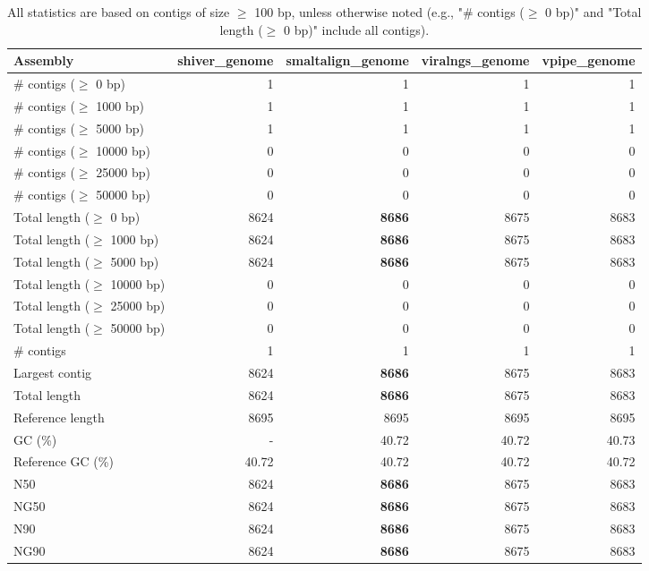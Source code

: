 \documentclass[12pt,a4paper]{article}
\begin{document}
\begin{table}[ht]
\begin{center}
\caption{All statistics are based on contigs of size $\geq$ 100 bp, unless otherwise noted (e.g., "\# contigs ($\geq$ 0 bp)" and "Total length ($\geq$ 0 bp)" include all contigs).}
\begin{tabular}{|l*{4}{|r}|}
\hline
Assembly & shiver\_genome & smaltalign\_genome & viralngs\_genome & vpipe\_genome \\ \hline
\# contigs ($\geq$ 0 bp) & 1 & 1 & 1 & 1 \\ \hline
\# contigs ($\geq$ 1000 bp) & 1 & 1 & 1 & 1 \\ \hline
\# contigs ($\geq$ 5000 bp) & 1 & 1 & 1 & 1 \\ \hline
\# contigs ($\geq$ 10000 bp) & 0 & 0 & 0 & 0 \\ \hline
\# contigs ($\geq$ 25000 bp) & 0 & 0 & 0 & 0 \\ \hline
\# contigs ($\geq$ 50000 bp) & 0 & 0 & 0 & 0 \\ \hline
Total length ($\geq$ 0 bp) & 8624 & {\bf 8686} & 8675 & 8683 \\ \hline
Total length ($\geq$ 1000 bp) & 8624 & {\bf 8686} & 8675 & 8683 \\ \hline
Total length ($\geq$ 5000 bp) & 8624 & {\bf 8686} & 8675 & 8683 \\ \hline
Total length ($\geq$ 10000 bp) & 0 & 0 & 0 & 0 \\ \hline
Total length ($\geq$ 25000 bp) & 0 & 0 & 0 & 0 \\ \hline
Total length ($\geq$ 50000 bp) & 0 & 0 & 0 & 0 \\ \hline
\# contigs & 1 & 1 & 1 & 1 \\ \hline
Largest contig & 8624 & {\bf 8686} & 8675 & 8683 \\ \hline
Total length & 8624 & {\bf 8686} & 8675 & 8683 \\ \hline
Reference length & 8695 & 8695 & 8695 & 8695 \\ \hline
GC (\%) & - & 40.72 & 40.72 & 40.73 \\ \hline
Reference GC (\%) & 40.72 & 40.72 & 40.72 & 40.72 \\ \hline
N50 & 8624 & {\bf 8686} & 8675 & 8683 \\ \hline
NG50 & 8624 & {\bf 8686} & 8675 & 8683 \\ \hline
N90 & 8624 & {\bf 8686} & 8675 & 8683 \\ \hline
NG90 & 8624 & {\bf 8686} & 8675 & 8683 \\ \hline

\end{tabular}
\end{center}
\end{table}
\end{document}
